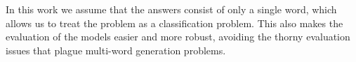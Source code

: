 \documentclass{article} %
\renewcommand{\#}[1]{\textbf{#1}}
\begin{document}
In this work we assume that the answers consist of only a single word,
which allows us to treat the problem as a classification problem. This also
makes the evaluation of the models easier and more robust, avoiding the thorny
evaluation issues that plague multi-word generation problems.

\end{document}
